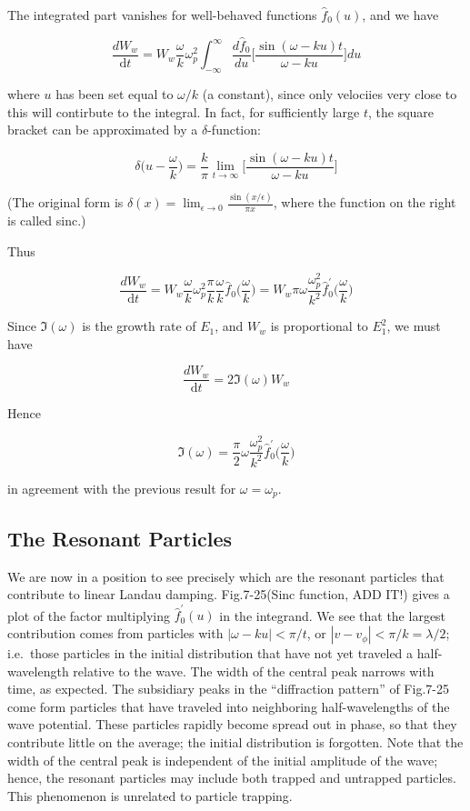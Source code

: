\documentclass[
  notoc %
]{tufte-book}
\begin{document}
The integrated part vanishes for well-behaved functions
\(\hat{f}_0(u)\), and we have

\[
\frac{dW_w}{\mathrm{d}t} = W_w\frac{\omega}{k}\omega_p^2 \int_{-\infty}^{\infty} \frac{d\hat{f}_0}{du}\Big[\frac{\sin(\omega-ku)t}{\omega-ku}\Big] du
\]

where \(u\) has been set equal to \(\omega/k\) (a constant), since only
velociies very close to this will contirbute to the integral. In fact,
for sufficiently large \(t\), the square bracket can be approximated by
a \(\delta\)-function:

\[
\delta\Big( u - \frac{\omega}{k}\Big) = \frac{k}{\pi}\lim_{t\rightarrow\infty}\Big[ \frac{\sin(\omega-ku) t}{\omega-ku} \Big]
\]

(The original form is
\(\delta(x) = \lim_{\epsilon\rightarrow 0}\frac{\sin(x/\epsilon)}{\pi x}\),
where the function on the right is called sinc.)

Thus

\[
\frac{dW_w}{\mathrm{d}t} = W_w\frac{\omega}{k}\omega_p^2 \frac{\pi}{k}\frac{\omega}{k}\hat{f}_0\Big(\frac{\omega}{k}\Big) = W_w \pi \omega\frac{\omega_p^2}{k^2}\hat{f}_0^\prime\Big(\frac{\omega}{k}\Big)
\]

Since \(\Im(\omega)\) is the growth rate of \(E_1\), and \(W_w\) is
proportional to \(E_1^2\), we must have

\[
\frac{dW_w}{\mathrm{d}t} = 2\Im(\omega)W_w
\]

Hence

\[
\Im(\omega) = \frac{\pi}{2}\omega\frac{\omega_p^2}{k^2}\hat{f}_0^\prime\Big(\frac{\omega}{k}\Big)
\]

in agreement with the previous result for \(\omega=\omega_p\).

\hypertarget{the-resonant-particles}{%
\subsection{The Resonant Particles}\label{the-resonant-particles}}

We are now in a position to see precisely which are the resonant
particles that contribute to linear Landau damping. Fig.7-25(Sinc
function, ADD IT!) gives a plot of the factor multiplying
\(\hat{f}_0^\prime(u)\) in the integrand. We see that the largest
contribution comes from particles with \(|\omega - ku| < \pi/t\), or
\(|v-v_\phi| < \pi/k = \lambda/2\); i.e.~those particles in the initial
distribution that have not yet traveled a half-wavelength relative to
the wave. The width of the central peak narrows with time, as expected.
The subsidiary peaks in the ``diffraction pattern'' of Fig.7-25 come
form particles that have traveled into neighboring half-wavelengths of
the wave potential. These particles rapidly become spread out in phase,
so that they contribute little on the average; the initial distribution
is forgotten. Note that the width of the central peak is independent of
the initial amplitude of the wave; hence, the resonant particles may
include both trapped and untrapped particles. This phenomenon is
unrelated to particle trapping.
\end{document}

